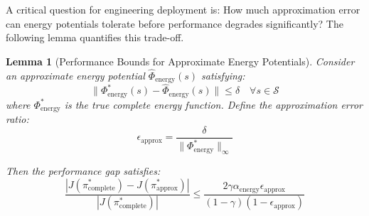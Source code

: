 \documentclass[journal]{IEEEtran}
\newtheorem{lemma}[theorem]{Lemma}
\begin{document}
	A critical question for engineering deployment is: How much approximation error can energy potentials tolerate before performance degrades significantly? The following lemma quantifies this trade-off.
	
	\begin{lemma}[Performance Bounds for Approximate Energy Potentials]
		\label{lem:approx_potential}
		Consider an approximate energy potential $\hat{\Phi}_{\text{energy}}(s)$ satisfying:
		\begin{equation}
			\|\Phi^*_{\text{energy}}(s) - \hat{\Phi}_{\text{energy}}(s)\| \leq \delta \quad \forall s\in\mathcal{S}
		\end{equation}
		where $\Phi^*_{\text{energy}}$ is the true complete energy function. Define the approximation error ratio:
		\begin{equation}
			\epsilon_{\text{approx}} = \frac{\delta}{\|\Phi^*_{\text{energy}}\|_\infty}
		\end{equation}
		
		Then the performance gap satisfies:
		\begin{equation}
			\frac{|J(\pi^*_{\text{complete}}) - J(\pi^*_{\text{approx}})|}{|J(\pi^*_{\text{complete}})|} \leq \frac{2\gamma\alpha_{\text{energy}}\epsilon_{\text{approx}}}{(1-\gamma)(1-\epsilon_{\text{approx}})}
			\label{eq:performance_bound}
		\end{equation}
	\end{lemma}
	
\end{document}
